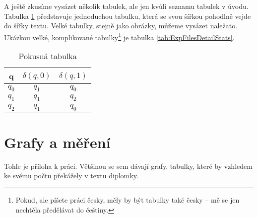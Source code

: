 \documentclass[bc,male,java,dept460]{diploma}		%
\begin{document}

A ještě zkusíme vysázet několik tabulek, ale jen kvůli seznamu tabulek v úvodu. Tabulka \ref{tab:ExpTable} představuje jednoduchou tabulku, která se svou šířkou pohodlně vejde do šířky textu. Velké tabulky, stejně jako obrázky, můžeme vysázet naležato. Ukázkou velké, komplikované tabulky\footnote{Pokud, ale píšete práci česky, měly by být tabulky také česky -- mě se jen nechtěla předělávat do češtiny.} je tabulka \ref{tab:ExpFilesDetailStats}.
 
\begin{table}
  \centering
  \begin{tabular}{|c|c|c|}
    \hline
    q & $\delta(q, 0)$ & $\delta(q, 1)$ \\
    \hline
    $q_0$ & $q_1$ & $q_0$ \\
    \hline
    $q_1$ & $q_1$ & $q_2$ \\
    \hline
    $q_2$ & $q_1$ & $q_0$ \\
    \hline
  \end{tabular}
  \caption{Pokusná tabulka}
  \label{tab:ExpTable}
\end{table}

\appendix
\section{Grafy a měření}
Tohle je příloha k práci. Většinou se sem dávají grafy, tabulky, které by vzhledem
ke svému počtu překážely v textu diplomky.
\clearpage

\end{document}
